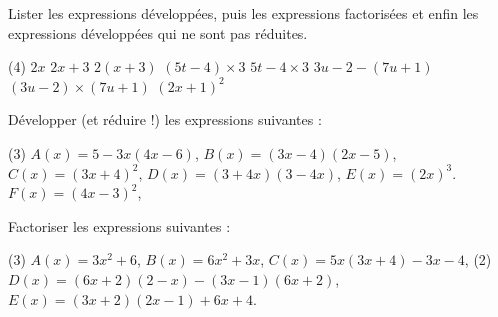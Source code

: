 \begin{exr}
Lister les expressions développées, puis les expressions factorisées et enfin les expressions développées qui ne sont pas réduites.
\begin{tasks}[label=\alph*)](4)
\task $2x$
\task $2x+3$
\task $2(x+3)$
\task $(5t-4)\times 3$
\task $5t-4\times3$
\task $3u-2-(7u+1)$
\task $(3u-2)\times(7u+1)$
\task $(2x+1)^2$
\end{tasks}
\end{exr}
%
\begin{exr}
Développer (et réduire !) les expressions suivantes :

\begin{tasks}[label=\labelitemi](3)
\task$A(x)=5-3x(4x-6)$, 
\task $B(x)=(3x-4)(2x-5)$, 
\task $C(x)=(3x+4)^2$,
\task $D(x)=(3+4x)(3-4x)$,
\task $E(x)=(2x)^3$.
\task  $F(x)=(4x-3)^2$,
\end{tasks}
\end{exr}
%
\begin{exr}
Factoriser les expressions suivantes :

\begin{tasks}[label=\labelitemi](3)
\task $A(x)=3x^2+6$,
\task $B(x)=6x^2+3x$,
\task  $C(x)=5x(3x+4)-3x-4$,
\task*(2) $D(x)=(6x+2)(2-x)-(3x-1)(6x+2)$,
\task  $E(x)=(3x+2)(2x-1)+6x+4$.
\end{tasks}
\end{exr}